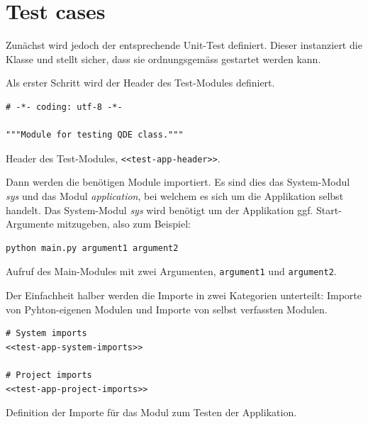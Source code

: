 \documentclass[10pt, openright, notitlepage]{scrreprt}
\begin{document}
\section{Test cases}
\label{sec:org969867f}

Zunächst wird jedoch der entsprechende Unit-Test definiert. Dieser instanziert
die Klasse und stellt sicher, dass sie ordnungsgemäss gestartet werden kann.

Als erster Schritt wird der Header des Test-Modules definiert.

\begin{listing}[H]
\begin{verbatim}
# -*- coding: utf-8 -*-

"""Module for testing QDE class."""
\end{verbatim}
\caption{\label{test-app-header}
Header des Test-Modules, \texttt{<<test-app-header>>}.}
\end{listing}

Dann werden die benötigen Module importiert. Es sind dies das System-Modul
\emph{sys} und das Modul \emph{application}, bei welchem es sich um die Applikation
selbst handelt. Das System-Modul \emph{sys} wird benötigt um der Applikation ggf.
Start-Argumente mitzugeben, also zum Beispiel:

\begin{listing}[H]
\begin{verbatim}
python main.py argument1 argument2
\end{verbatim}
\caption{\label{fig:impl-python-call-arguments}
Aufruf des Main-Modules mit zwei Argumenten, \texttt{argument1} und \texttt{argument2}.}
\end{listing}

Der Einfachheit halber werden die Importe in zwei Kategorien unterteilt: Importe
von Pyhton-eigenen Modulen und Importe von selbst verfassten Modulen.

\begin{listing}[H]
\begin{verbatim}
# System imports
<<test-app-system-imports>>

# Project imports
<<test-app-project-imports>>
\end{verbatim}
\caption{\label{test-app-imports}
Definition der Importe für das Modul zum Testen der Applikation.}
\end{listing}
\end{document}
